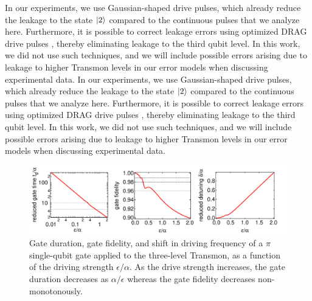 \smallskip

In our experiments, we use Gaussian-shaped drive pulses, which already reduce the leakage to the state $\left| 2 \right>$ compared to the continuous pulses that we analyze here. Furthermore, it is possible to correct leakage errors using optimized DRAG drive pulses \cite{lucero_reduced_2010,chow_optimized_2010}, thereby eliminating leakage to the third qubit level. In this work, we did not use such techniques, and we will include possible errors arising due to leakage to higher Transmon levels in our error models when discussing experimental data.
In our experiments, we use Gaussian-shaped drive pulses, which already reduce the leakage to the state $\left| 2 \right>$ compared to the continuous pulses that we analyze here. Furthermore, it is possible to correct leakage errors using optimized DRAG drive pulses \cite{lucero_reduced_2010,chow_optimized_2010}, thereby eliminating leakage to the third qubit level. In this work, we did not use such techniques, and we will include possible errors arising due to leakage to higher Transmon levels in our error models when discussing experimental data.

\begin{figure}[htp!]
	\centering
	\includegraphics[width=\textwidth]{"./material/mathematica/three_level_driving_errors"}
	\caption[Single-qubit $\pi$-pulse gate time, gate fidelity and AC stark detuning as a function of drive strength]{Gate duration, gate fidelity, and shift in driving frequency of a $\pi$ single-qubit gate applied to the three-level Transmon, as a function of the driving strength $\epsilon/\alpha$. As the drive strength increases, the gate duration decreases as $\alpha/\epsilon$ whereas the gate fidelity decreases non-monotonously.}
	\label{fig:three_level_driving_errors}
\end{figure}

\smallskip 

